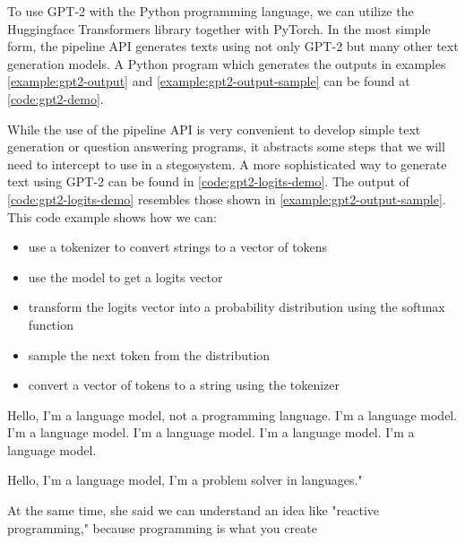 \documentclass[english,version-2020-11]{uzl-thesis}
\begin{document}
To use GPT-2 with the Python programming language, we can utilize the Huggingface Transformers library together with PyTorch.
In the most simple form, the pipeline API generates texts using not only GPT-2 but many other text generation models.
A Python program which generates the outputs in examples \ref{example:gpt2-output} and \ref{example:gpt2-output-sample} can be found at \autoref{code:gpt2-demo}.

While the use of the pipeline API is very convenient to develop simple text generation or question answering programs, it abstracts some steps that we will need to intercept to use in a stegosystem.
A more sophisticated way to generate text using GPT-2 can be found in \autoref{code:gpt2-logits-demo}.
The output of \autoref{code:gpt2-logits-demo} resembles those shown in \autoref{example:gpt2-output-sample}. 
This code example shows how we can:

\begin{itemize}
	\item use a tokenizer to convert strings to a vector of tokens
	\item use the model to get a logits vector
	\item transform the logits vector into a probability distribution using the softmax function
	\item sample the next token from the distribution
	\item convert a vector of tokens to a string using the tokenizer
\end{itemize}








\begin{example}
	Hello, I'm a language model, not a programming language. I'm a language model. I'm a language model. I'm a language model. I'm a language model. I'm a language model.
	\label{example:gpt2-output}
\end{example}

\begin{example}
	Hello, I'm a language model, I'm a problem solver in languages."

	At the same time, she said we can understand an idea like "reactive programming," because programming is what you create
	\label{example:gpt2-output-sample}
\end{example}
\end{document}
